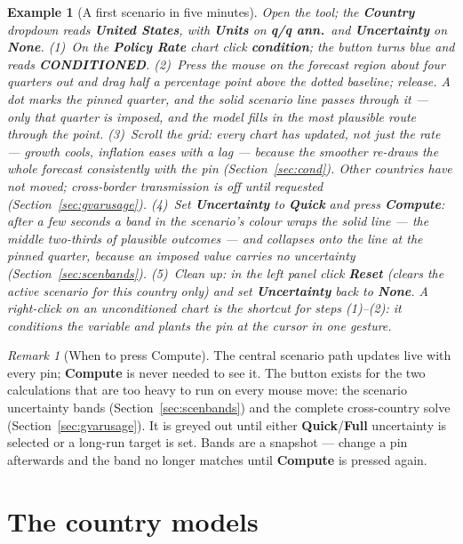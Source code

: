 \documentclass[11pt]{article}
\newcommand{\ui}[1]{\textbf{#1}}
\theoremstyle{plain}
\newtheorem{example}{Example}
\theoremstyle{remark}
\newtheorem{remark}{Remark}
\begin{document}
\begin{example}[A first scenario in five minutes]\label{ex:first}
Open the tool; the \ui{Country} dropdown reads \ui{United States}, with
\ui{Units} on \ui{q/q ann.}\ and \ui{Uncertainty} on \ui{None}.
(1)~On the \ui{Policy Rate} chart click \ui{condition}; the button turns
blue and reads \ui{CONDITIONED}. (2)~Press the mouse on the forecast
region about four quarters out and drag half a percentage point above
the dotted baseline; release. A dot marks the pinned quarter, and the
solid scenario line passes through it --- only that quarter is imposed,
and the model fills in the most plausible route through the point.
(3)~Scroll the grid: every chart has updated, not just the rate ---
growth cools, inflation eases with a lag --- because the smoother
re-draws the whole forecast consistently with the pin
(Section~\ref{sec:cond}). Other countries have not moved;
cross-border transmission is off until requested
(Section~\ref{sec:gvarusage}). (4)~Set \ui{Uncertainty} to \ui{Quick}
and press \ui{Compute}: after a few seconds a band in the scenario's
colour wraps the solid line --- the middle two-thirds of plausible
outcomes --- and collapses onto the line at the pinned quarter, because
an imposed value carries no uncertainty
(Section~\ref{sec:scenbands}). (5)~Clean up: in the left panel click
\ui{Reset} (clears the active scenario for this country only) and set
\ui{Uncertainty} back to \ui{None}. A right-click on an unconditioned
chart is the shortcut for steps (1)--(2): it conditions the variable and
plants the pin at the cursor in one gesture.
\end{example}

\begin{remark}[When to press Compute]\label{rem:compute}
The central scenario path updates live with every pin; \ui{Compute} is
never needed to see it. The button exists for the two calculations that
are too heavy to run on every mouse move: the scenario uncertainty bands
(Section~\ref{sec:scenbands}) and the complete cross-country solve
(Section~\ref{sec:gvarusage}). It is greyed out until either
\ui{Quick}/\ui{Full} uncertainty is selected or a long-run target is
set. Bands are a snapshot --- change a pin afterwards and the band no
longer matches until \ui{Compute} is pressed again.
\end{remark}

\section{The country models}\label{sec:bvar}
\end{document}
